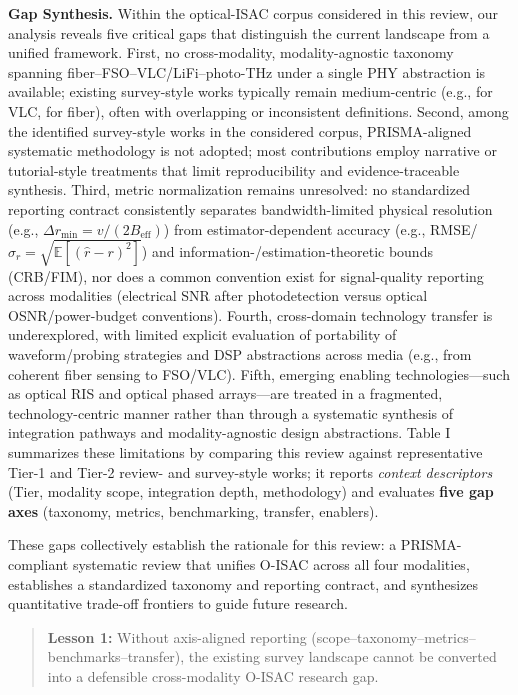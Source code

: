 \textbf{Gap Synthesis.} Within the optical-ISAC corpus considered in this review, our analysis reveals five critical gaps that distinguish the current landscape from a unified framework. First, no cross-modality, modality-agnostic taxonomy spanning fiber--FSO--VLC/LiFi--photo-THz under a single PHY abstraction is available; existing survey-style works typically remain medium-centric (e.g., \cite{O_ISAC_303} for VLC, \cite{O_ISAC_006} for fiber), often with overlapping or inconsistent definitions. Second, among the identified survey-style works in the considered corpus, PRISMA-aligned systematic methodology is not adopted; most contributions employ narrative or tutorial-style treatments that limit reproducibility and evidence-traceable synthesis. Third, metric normalization remains unresolved: no standardized reporting contract consistently separates bandwidth-limited physical resolution (e.g., $\Delta r_{\min} = v/(2B_{\text{eff}})$) from estimator-dependent accuracy (e.g., RMSE/$\sigma_r = \sqrt{\mathbb{E}[(\hat r - r)^2]}$) and information-/estimation-theoretic bounds (CRB/FIM), nor does a common convention exist for signal-quality reporting across modalities (electrical SNR after photodetection versus optical OSNR/power-budget conventions). Fourth, cross-domain technology transfer is underexplored, with limited explicit evaluation of portability of waveform/probing strategies and DSP abstractions across media (e.g., from coherent fiber sensing to FSO/VLC). Fifth, emerging enabling technologies---such as optical RIS and optical phased arrays---are treated in a fragmented, technology-centric manner rather than through a systematic synthesis of integration pathways and modality-agnostic design abstractions. Table I summarizes these limitations by comparing this review against representative Tier-1 and Tier-2 review- and survey-style works; it reports \textit{context descriptors} (Tier, modality scope, integration depth, methodology) and evaluates \textbf{five gap axes} (taxonomy, metrics, benchmarking, transfer, enablers).

These gaps collectively establish the rationale for this review: a PRISMA-compliant systematic review that unifies O-ISAC across all four modalities, establishes a standardized taxonomy and reporting contract, and synthesizes quantitative trade-off frontiers to guide future research.

\begin{quote}
\textbf{Lesson 1:} Without axis-aligned reporting (scope--taxonomy--metrics--benchmarks--transfer), the existing survey landscape cannot be converted into a defensible cross-modality O-ISAC research gap.
\end{quote}

